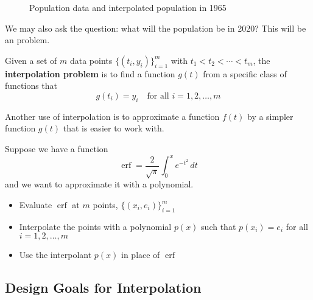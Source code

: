 \begin{example}
\begin{figure}[H]
        \caption{Population data and interpolated population in 1965}
    \end{figure}

    We may also ask the question: what will the population be in 2020? This will be an  problem.
\end{example}

\begin{definition}
    Given a set of \( m \) data points \( \{ (t_i, y_i) \}_{i=1}^{m} \) with \( t_1 < t_2 < \cdots < t_m \), the \textbf{interpolation problem} is to find a function \( g(t) \) from a specific class of functions that \[
        g(t_i) = y_i \quad \text{for all } i = 1, 2, \ldots, m
    \]
\end{definition}

\begin{remark}
    Another use of interpolation is to approximate a function \( f(t) \) by a simpler function \( g(t) \) that is easier to work with.
\end{remark}

\begin{example}
    Suppose we have a function \[
        \operatorname{erf} = \frac{2}{\sqrt{\pi}} \int_{0}^{x} e^{-t^2} \, dt
    \] and we want to approximate it with a polynomial.
    \begin{itemize}
        \item Evaluate \( \operatorname{erf} \) at \( m \) points, \( \{ (x_i, e_i) \}_{i=1}^{m} \)
        \item Interpolate the points with a polynomial \( p(x) \) such that \( p(x_i) = e_i \) for all \( i = 1, 2, \ldots, m \)
        \item Use the interpolant \( p(x) \) in place of \( \operatorname{erf} \)
    \end{itemize}
\end{example}

\subsection{Design Goals for Interpolation}

